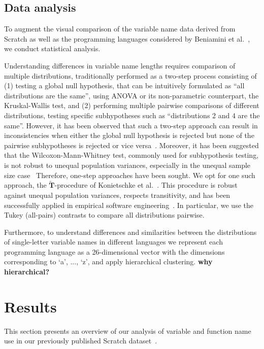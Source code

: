 \documentclass[conference]{IEEEtran}
\newcommand{\todo}[1]{ \textbf{#1} }
\begin{document}
\subsection{Data analysis}
To augment the visual comparison of the variable name data derived from Scratch as well as the programming languages considered by Beniamini et al.~\cite{Beniamini}, we conduct statistical analysis. 

Understanding differences in variable name lengths requires comparison of multiple distributions, traditionally performed as a two-step process consisting of (1) testing a global null hypothesis, that can be intuitively formulated as ``all distributions are the same'', using ANOVA or its non-parametric counterpart, the Kruskal-Wallis test, and (2) performing multiple pairwise comparisons of different distributions, testing specific subhypotheses such as ``distributions 2 and 4 are the same''. 
However, it has been observed that such a two-step approach can result in inconsistencies when either the global null hypothesis is rejected but none of the pairwise subhypotheses is rejected or vice versa~\cite{Gabriel}. 
Moreover, it has been suggested that the Wilcoxon-Mann-Whitney test, commonly used for subhypothesis testing, is not robust to unequal population variances, especially in the unequal sample size case~\cite{Zimmerman:Zumbo}
Therefore, one-step approaches have been sought.
We opt for one such approach, the $\widetilde{\mathbf{T}}$-procedure of Konietschke et al.~\cite{Konietschke:Hothorn:Brunner}. 
This procedure is robust against unequal population variances, respects transitivity, and has been successfully applied in empirical software engineering~\cite{VasilescuSGM14,VasilescuCS14,YuWYW16}.
In particular, we use the Tukey (all-pairs) contrasts to compare all distributions pairwise.

Furthermore, to understand differences and similarities between the distributions of single-letter variable names in different languages we represent each programming language as a 26-dimensional vector with the dimensions corresponding to `a', ..., `z', and apply hierarchical clustering. \todo{why hierarchical?}


 \section{Results}
This section presents an overview of our analysis of variable and function name use in our previously published Scratch dataset~\cite{Aivaloglou2016HowKC}. 
\end{document}
